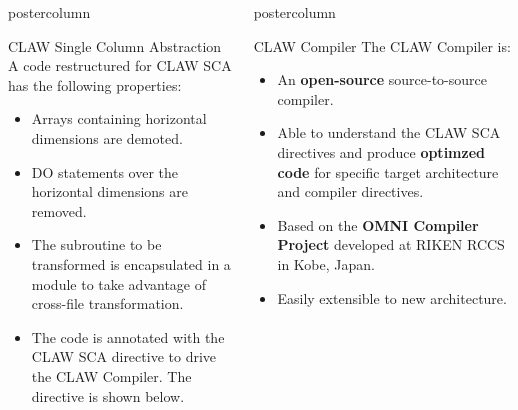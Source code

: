 \documentclass{beamer}
\newlength{\columnheight}
\begin{document}
\begin{frame}
\begin{columns}
\begin{column}{.43\textwidth}
\begin{beamercolorbox}[center]{postercolumn}
\begin{minipage}{.98\textwidth}
{\begin{myblock}{CLAW Single Column Abstraction}
A code restructured for CLAW SCA has the following properties:
\begin{itemize}
  \item Arrays containing horizontal dimensions are demoted.
  \item DO statements over the horizontal dimensions are removed.
  \item The subroutine to be transformed is encapsulated in a module to take
        advantage of cross-file transformation.
  \item The code is annotated with the CLAW SCA directive to drive the CLAW
        Compiler. The directive is shown below.
\end{itemize}

\clawa

\end{myblock}\vfill

}\end{minipage}\end{beamercolorbox}
\end{column}

%
%
\begin{column}{.57\textwidth}
\begin{beamercolorbox}[center]{postercolumn}
\begin{minipage}{.98\textwidth} %
\parbox[t][\columnheight]{\textwidth}{ %

%
%
\begin{myblock}{CLAW Compiler}
The CLAW Compiler is:
\begin{itemize}
  \item An \textbf{open-source} source-to-source compiler.
  \item Able to understand the CLAW SCA directives and produce \textbf{optimzed
        code} for specific target architecture and compiler directives.
  \item Based on the \textbf{OMNI Compiler Project}\cite{Omni} developed at
        RIKEN RCCS in Kobe, Japan.
  \item Easily extensible to new architecture.
\end{itemize}

\begin{figure}
\end{figure}
\end{myblock}}
\end{minipage}
\end{beamercolorbox}
\end{column}
\end{columns}
\end{frame}
\end{document}
